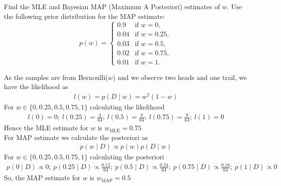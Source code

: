 \documentclass[solution,addpoints,12pt]{exam}
\begin{document}
\begin{questions}
\begin{parts}
Find the MLE and Bayesian MAP (Maximum A Posteriori) estimates of $w$. Use the following prior distribution for the MAP estimate:
\[
p(w) =
\begin{cases}
0.9  & \text{if } w = 0, \\
0.04 & \text{if } w = 0.25, \\
0.03 & \text{if } w = 0.5, \\
0.02 & \text{if } w = 0.75, \\
0.01 & \text{if } w = 1.
\end{cases}
\]
\begin{solution}
	As the samples are from Bernoulli($w$) and we observe two heads and one trail, we have the likelihood as
	\begin{align*}
		l(w)=p(D\mid w) = w^2(1-w)
	\end{align*}
	For $w\in\{0,0.25,0.5,0.75,1\}$ calculating the likelihood 
	\begin{align*}
		l(0)=0;~l(0.25)=\frac{3}{64};~l(0.5)=\frac{8}{64};~l(0.75)=\frac{9}{64};~l(1)=0
	\end{align*}
	Hence the MLE estimate for $w$ is $w_{\text{MLE}}=0.75$\\
	For MAP estimate we calculate the posteriori as 
	\begin{align*}
		p(w\mid D) \propto p(w) p(D\mid w)
	\end{align*}
	For $w\in\{0,0.25,0.5,0.75,1\}$ calculating the posteriori
	\begin{align*}
		p(0\mid D)\propto0;~p(0.25\mid D)\propto\frac{0.12}{64};~p(0.5\mid D)\propto\frac{0.24}{64};~p(0.75\mid D)\propto\frac{0.18}{64};~p(1\mid D)\propto0
	\end{align*}
	So, the MAP estimate for $w$ is $w_{\text{MAP}}=0.5$
\end{solution}
\end{parts}

\begin{parts}

\end{parts}
\end{questions}
\end{document}
